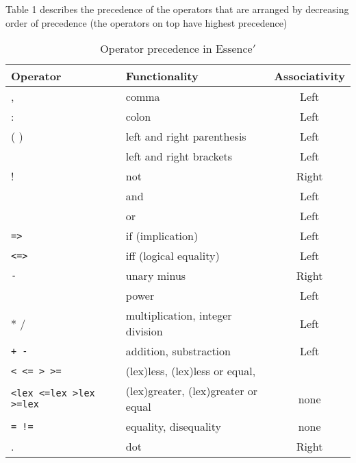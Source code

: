 \documentclass{article}
\begin{document}
Table 1 %
describes the precedence of the operators that 
are arranged by decreasing order of precedence (the operators on top have highest precedence)


\begin{table}


    
    \begin{center}
    \begin{tabular}{|l|lc|}
 
      \hline
       Operator & Functionality & Associativity \\
       \hline
       \hline
       ,   & comma & Left \\   
       \hline
       :   & colon & Left \\
       \hline
       ( ) & left and right parenthesis & Left \\
       \hline
       \verb1[ ]1 & left and right brackets & Left \\
       \hline
       ! & not & Right \\  
       \hline
       \verb1/\1 & and & Left \\ 
       \hline
       \verb1\/1 & or & Left \\ 
       \hline
        {\tt =>} & if (implication)  & Left \\ 
	\hline
        {\tt <=>} & iff (logical equality) & Left \\ 
	\hline
        {\tt -} & unary minus & Right \\
	\hline
        \verb1^1 & power & Left \\ 
	\hline
        * / & multiplication, integer division & Left \\ 
	\hline
        {\tt + -} & addition, substraction &  Left \\
	\hline
        {\tt < <= > >= } & (lex)less, (lex)less or equal, &  \\ 
	{\tt <lex <=lex >lex >=lex } & (lex)greater, (lex)greater or equal & none \\ 
	\hline
        {\tt = !=} & equality, disequality & none \\
	\hline
        . & dot & Right \\ 
	\hline

      \end{tabular}\label{tab:precedence}
\end{center}
    \caption{Operator precedence in {\sc Essence}$'$}


\end{table}
\end{document}
